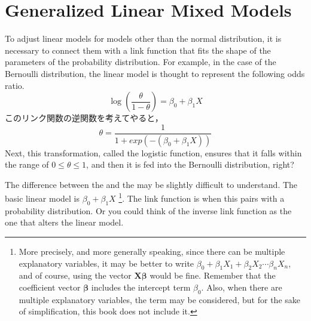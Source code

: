 \documentclass{ltjsbook}
\begin{document}
\section{Generalized Linear Mixed Models}
To adjust linear models for models other than the normal distribution, it is necessary to connect them with a link function that fits the shape of the parameters of the probability distribution. For example, in the case of the Bernoulli distribution, the linear model is thought to represent the following odds ratio.
\[ \log\left(\frac{\theta}{1-\theta}\right) =  \beta_0 + \beta_1 X \]
このリンク関数の逆関数を考えてやると，
\[ \theta = \frac{1}{1+exp(-(\beta_0+\beta_1 X))} \]
Next, this transformation, called the logistic function, ensures that it falls within the range of $0 \le \theta \le 1$, and then it is fed into the Bernoulli distribution, right?

The difference between the  and the  may be slightly difficult to understand. The basic linear model is $\beta_0 + \beta_1 X$ \footnote{More precisely, and more generally speaking, since there can be multiple explanatory variables, it may be better to write $\beta_0 + \beta_1 X_1 + \beta_2 X_2 \cdots \beta_n X_n$, and of course, using the vector $\bm{X\beta}$ would be fine. Remember that the coefficient vector $\bm{\beta}$ includes the intercept term $\beta_0$. Also, when there are multiple explanatory variables, the  term may be considered, but for the sake of simplification, this book does not include it.}. The link function is when this pairs with a probability distribution. Or you could think of the inverse link function as the one that alters the linear model.
\end{document}
